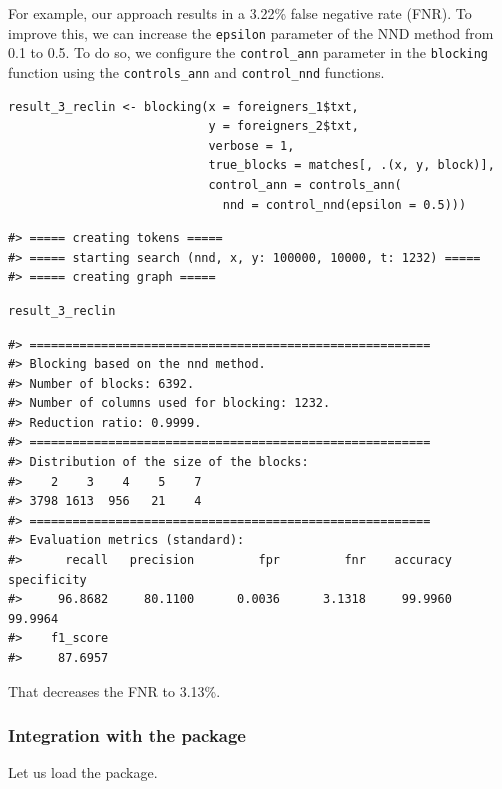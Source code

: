 For example, our approach results in a 3.22\% false negative rate (FNR). To improve this, we can increase the \texttt{epsilon} parameter of the NND method from 0.1 to 0.5. To do so, we configure the \texttt{control\_ann} parameter in the \texttt{blocking} function using the \texttt{controls\_ann} and \texttt{control\_nnd} functions.

\begin{verbatim}
result_3_reclin <- blocking(x = foreigners_1$txt,
                            y = foreigners_2$txt,
                            verbose = 1,
                            true_blocks = matches[, .(x, y, block)],
                            control_ann = controls_ann(
                              nnd = control_nnd(epsilon = 0.5)))
\end{verbatim}

\begin{verbatim}
#> ===== creating tokens =====
#> ===== starting search (nnd, x, y: 100000, 10000, t: 1232) =====
#> ===== creating graph =====
\end{verbatim}

\begin{verbatim}
result_3_reclin
\end{verbatim}

\begin{verbatim}
#> ========================================================
#> Blocking based on the nnd method.
#> Number of blocks: 6392.
#> Number of columns used for blocking: 1232.
#> Reduction ratio: 0.9999.
#> ========================================================
#> Distribution of the size of the blocks:
#>    2    3    4    5    7 
#> 3798 1613  956   21    4 
#> ========================================================
#> Evaluation metrics (standard):
#>      recall   precision         fpr         fnr    accuracy specificity 
#>     96.8682     80.1100      0.0036      3.1318     99.9960     99.9964 
#>    f1_score 
#>     87.6957
\end{verbatim}

That decreases the FNR to 3.13\%.

\subsubsection{\texorpdfstring{Integration with the  package}{Integration with the  package}}\label{integration-with-the-package}

Let us load the  package.

